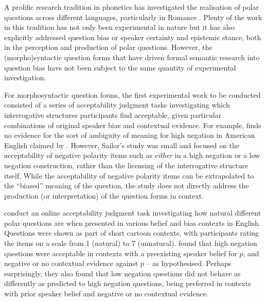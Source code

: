\documentclass[output=paper,colorlinks,citecolor=brown]{langscibook}
\begin{document}
A prolific research tradition in phonetics has investigated the realisation of polar questions across different languages, particularly in Romance \citep[e.g.][]{crocco2006prosodic, escandell-vidal_intonation_2017, giordano2006intonation, grice1997can, grice2003map, grice2004information, henriksen2016intonational}. Plenty of the work in this tradition has not only been experimental in nature but it has also explicitly addressed question bias or speaker certainty and epistemic stance, both in the perception \citep{armstrong2015contribution, vanrell2017experimental, orrico2019perception, prieto2018question} and production \citep{armstrong2017accounting, del2014intonation} of polar questions. However, the (morpho)syntactic question forms that have driven formal semantic research into question bias have not been subject to the same quantity of experimental investigation.

For morphosyntactic question forms, the first experimental work to be conducted consisted of a series of acceptability judgment tasks investigating which interrogative structures participants find acceptable, given particular combinations of original speaker bias and contextual evidence. For example, \citet{sailor_questionable1_2013} finds no evidence for the sort of ambiguity of meaning for high negation in American English claimed by \citet{ladd_first_1981}. However, Sailor's study was small and focused on the acceptability of negative polarity items such as \textit{either} in a high negation or a low negation construction, rather than the licensing of the interrogative structure itself. While the acceptability of negative polarity items can be extrapolated to the ``biased'' meaning of the question, the study does not directly address the production (or interpretation) of the question forms in context.

\citet{roelofsen_positive_2012} conduct an online acceptability judgment task investigating how natural different polar questions are when presented in various belief and bias contexts in English. Questions were shown as part of short cartoon contexts, with participants rating the items on a scale from 1 (natural) to 7 (unnatural). \citet{roelofsen_positive_2012} found that high negation questions were acceptable in contexts with a preexisting speaker belief for $p$, and negative or no contextual evidence against $p$ – as hypothesised. Perhaps surprisingly, they also found that low negation questions did not behave as differently as predicted to high negation questions, being preferred in contexts with prior speaker belief and negative or no contextual evidence.
\end{document}
